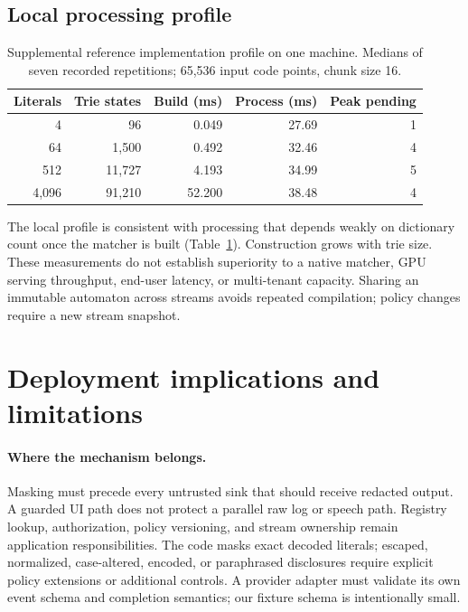 \documentclass[11pt,a4paper]{article}
\begin{document}
\subsection{Local processing profile}
\begin{table}[t]
\centering\small
\caption{Supplemental reference implementation profile on one machine. Medians of seven recorded repetitions; 65,536 input code points, chunk size 16.}
\label{tab:timing}
\begin{tabular}{rrrrr}\toprule
Literals & Trie states & Build (ms) & Process (ms) & Peak pending\\\midrule
4 & 96 & 0.049 & 27.69 & 1\\
64 & 1,500 & 0.492 & 32.46 & 4\\
512 & 11,727 & 4.193 & 34.99 & 5\\
4,096 & 91,210 & 52.200 & 38.48 & 4\\\bottomrule
\end{tabular}
\end{table}
The local profile is consistent with processing that depends weakly on dictionary count once the matcher is built (Table~\ref{tab:timing}). Construction grows with trie size. These measurements do not establish superiority to a native matcher, GPU serving throughput, end-user latency, or multi-tenant capacity. Sharing an immutable automaton across streams avoids repeated compilation; policy changes require a new stream snapshot.

\section{Deployment implications and limitations}
\paragraph{Where the mechanism belongs.}
Masking must precede every untrusted sink that should receive redacted output. A guarded UI path does not protect a parallel raw log or speech path. Registry lookup, authorization, policy versioning, and stream ownership remain application responsibilities. The code masks exact decoded literals; escaped, normalized, case-altered, encoded, or paraphrased disclosures require explicit policy extensions or additional controls. A provider adapter must validate its own event schema and completion semantics; our fixture schema is intentionally small.
\end{document}
